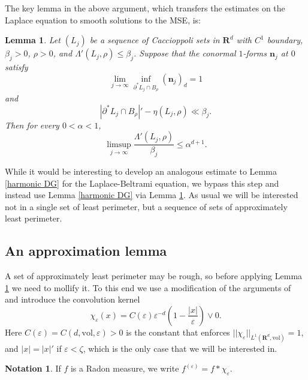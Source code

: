 \documentclass[reqno,12pt,letterpaper]{amsart}
\newcommand{\RR}{\mathbf{R}}
\newcommand{\normal}{\mathbf n}
\newcommand{\vol}{\mathrm{vol}}
\newtheorem{lemma}[theorem]{Lemma}
\theoremstyle{definition}
\newtheorem{notation}[theorem]{Notation}
\numberwithin{equation}{section}
\begin{document}
The key lemma \cite[Teorema 4.4]{Miranda66} in the above argument, which transfers the estimates on the Laplace equation to smooth solutions to the MSE, is:

\begin{lemma}\label{Giusti64}
Let $(L_j)$ be a sequence of Caccioppoli sets in $\RR^d$ with $C^1$ boundary, $\beta_j > 0$, $\rho > 0$, and $\Lambda'(L_j, \rho) \leq \beta_j$.
Suppose that the conormal $1$-forms $\normal_j$ at $0$ satisfy
$$\lim_{j \to \infty} \inf_{\partial^* L_j \cap B_\rho} (\normal_j)_d = 1$$
and
$$|\partial^* L_j \cap B_\rho|' - \eta(L_j, \rho) \ll \beta_j.$$
Then for every $0 < \alpha < 1$,
$$\limsup_{j \to \infty} \frac{\Lambda'(L_j, \rho)}{\beta_j} \leq \alpha^{d + 1}.$$
\end{lemma}

While it would be interesting to develop an analogous estimate to Lemma \ref{harmonic DG} for the Laplace-Beltrami equation, we bypass this step and instead use Lemma \ref{harmonic DG} via Lemma \ref{Giusti64}.
As usual we will be interested not in a single set of least perimeter, but a sequence of sets of approximately least perimeter.

\subsection{An approximation lemma}
A set of approximately least perimeter may be rough, so before applying Lemma \ref{Giusti64} we need to mollify it.
To this end we use a modification of the arguments of \cite[Chapter 7]{Giusti77} and introduce the convolution kernel
$$\chi_\varepsilon(x) = C(\varepsilon) \varepsilon^{-d}\left(1 - \frac{|x|}{\varepsilon}\right) \vee 0.$$
Here $C(\varepsilon) = C(d, \vol, \varepsilon) > 0$ is the constant that enforces $||\chi_\varepsilon||_{L^1(\RR^d, \vol)} = 1$, and $|x| = |x|'$ if $\varepsilon < \zeta$, which is the only case that we will be interested in.

\begin{notation}
If $f$ is a Radon measure, we write $f^{(\varepsilon)} = f * \chi_\varepsilon$.
\end{notation}
\end{document}
